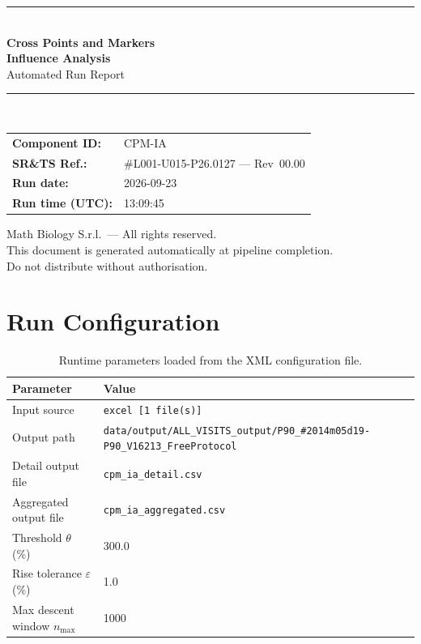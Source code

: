 \documentclass[a4paper,11pt]{article}
\begin{document}
\begin{titlepage}
\begin{center}
  \vspace*{1.8cm}
  {\color{dmaaccent}\rule{\linewidth}{1.5pt}}\\[0.6cm]
  {\LARGE\bfseries\color{dmaaccent}
    Cross Points and Markers\\[0.25cm]
    Influence Analysis}\\[0.4cm]
  {\Large Automated Run Report}\\[0.3cm]
  {\color{dmaaccent}\rule{\linewidth}{1.5pt}}\\[2cm]

  \begin{tabular}{ll}
    \textbf{Component ID:}   & CPM-IA \\[0.3cm]
    \textbf{SR\&TS Ref.:}    & \#L001-U015-P26.0127 --- Rev~00.00 \\[0.3cm]
    \textbf{Run date:}       & 2026-09-23 \\[0.3cm]
    \textbf{Run time (UTC):} & 13:09:45 \\
  \end{tabular}

  \vfill
  {\color{dmagray}\small
    Math Biology S.r.l.\ --- All rights reserved.\\
    This document is generated automatically at pipeline completion.\\
    Do not distribute without authorisation.}
\end{center}
\end{titlepage}

\tableofcontents
\clearpage

\section{Run Configuration}

\begin{table}[h!]
\centering
\small
\caption{Runtime parameters loaded from the XML configuration file.}
\begin{tabular}{ll}
\toprule
\textbf{Parameter} & \textbf{Value} \\
\midrule
Input source                      & \texttt{excel [1 file(s)]} \\
Output path                       & \texttt{data/output/ALL\_VISITS\_output/P90\_\#2014m05d19-P90\_V16213\_FreeProtocol} \\
Detail output file                & \texttt{cpm\_ia\_detail.csv} \\
Aggregated output file            & \texttt{cpm\_ia\_aggregated.csv} \\
Threshold $\theta$ (\%)           & 300.0 \\
Rise tolerance $\varepsilon$ (\%) & 1.0 \\
Max descent window $n_{\max}$     & 1000 \\
\bottomrule
\end{tabular}
\end{table}
\end{document}
